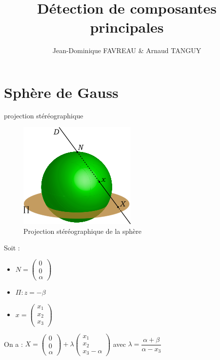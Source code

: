 \documentclass[11pt]{beamer}
\author{Jean-Dominique FAVREAU \& Arnaud TANGUY}
\title{Détection de composantes principales}
\begin{document}
\begin{frame}
\titlepage
\end{frame}

\section{Sphère de Gauss}
\begin{frame}{projection stéréographique}
\begin{multicols}{2}
\begin{figure}[hbtp]
\centering
\includegraphics[scale=.6]{220px-Stereo.png}
\caption{Projection stéréographique de la sphère}
\end{figure}
\columnbreak
Soit : \begin{itemize}
\item $N=\left(\begin{array}{l}0\\ 0\\ \alpha\end{array}\right)$
\item $\Pi : z=-\beta$
\item $x=\left(\begin{array}{l}x_1\\ x_2\\ x_3\end{array}\right)$
\end{itemize}
On a : $X = \left(\begin{array}{l}0\\ 0\\ \alpha\end{array}\right)+\lambda\left(\begin{array}{l}x_1\\ x_2\\ x_3-\alpha\end{array}\right)$
avec $\lambda = \dfrac{\alpha+\beta}{\alpha-x_3}$
\end{multicols}
\end{frame}
\end{document}
